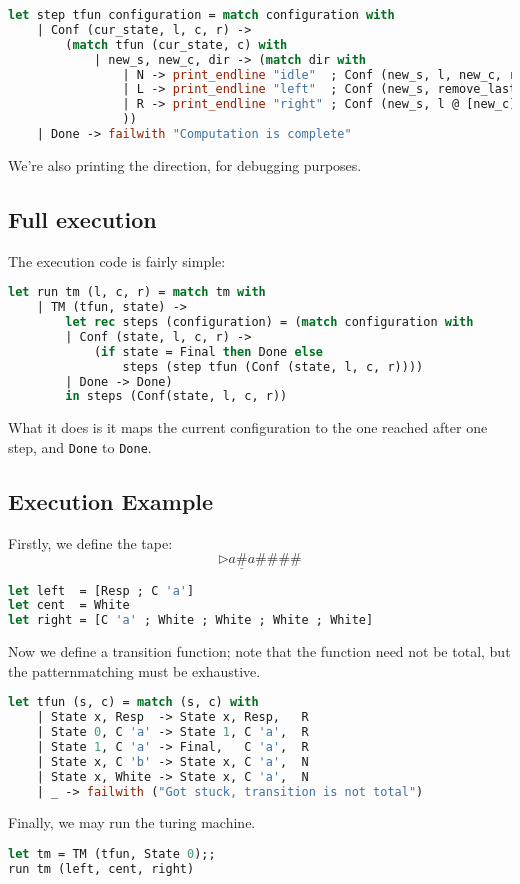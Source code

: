 \documentclass[a4paper,10pt]{article}
\begin{document}
\begin{lstlisting}[language = ml]
let step tfun configuration = match configuration with
    | Conf (cur_state, l, c, r) ->
        (match tfun (cur_state, c) with
            | new_s, new_c, dir -> (match dir with
                | N -> print_endline "idle"  ; Conf (new_s, l, new_c, r)
                | L -> print_endline "left"  ; Conf (new_s, remove_last l, get_last l, new_c :: r)
                | R -> print_endline "right" ; Conf (new_s, l @ [new_c], get_first r, remove_first r)
                ))
    | Done -> failwith "Computation is complete"
\end{lstlisting}
We're also printing the direction, for debugging purposes.

\subsection{Full execution}
The execution code is fairly simple:

\begin{lstlisting}[language = ml]
let run tm (l, c, r) = match tm with
    | TM (tfun, state) ->
        let rec steps (configuration) = (match configuration with
        | Conf (state, l, c, r) ->
            (if state = Final then Done else
                steps (step tfun (Conf (state, l, c, r))))
        | Done -> Done)
        in steps (Conf(state, l, c, r))
\end{lstlisting}

What it does is it maps the current configuration to the one reached after one step, and \texttt{Done} to \texttt{Done}.

\subsection{Execution Example}
Firstly, we define the tape:
\[\triangleright a \underline{\#} a \# \# \# \#\]

\begin{lstlisting}[language = ml]
let left  = [Resp ; C 'a']
let cent  = White
let right = [C 'a' ; White ; White ; White ; White]
\end{lstlisting}

Now we define a transition function; note that the function need not be total, but the patternmatching must be exhaustive.

\begin{lstlisting}[language = ml]
let tfun (s, c) = match (s, c) with
    | State x, Resp  -> State x, Resp,   R
    | State 0, C 'a' -> State 1, C 'a',  R
    | State 1, C 'a' -> Final,   C 'a',  R
    | State x, C 'b' -> State x, C 'a',  N
    | State x, White -> State x, C 'a',  N
    | _ -> failwith ("Got stuck, transition is not total")
\end{lstlisting}
Finally, we may run the turing machine.
\begin{lstlisting}[language = ml]
let tm = TM (tfun, State 0);;
run tm (left, cent, right)
\end{lstlisting}
\end{document}
